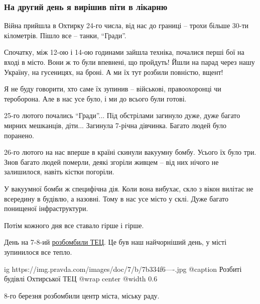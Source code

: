  
 
 
 
 

\subsubsection{На другий день я вирішив піти в лікарню}

Війна прийшла в Охтирку 24-го числа, від нас до границі – трохи більше 30-ти
кілометрів. Пішло все – танки, \enquote{Гради}.

Спочатку, між 12-ою і 14-ою годинами зайшла техніка, почалися перші бої на
вході в місто. Вони ж то були впевнені, що пройдуть! Йшли на парад через нашу
Україну, на гусеницях, на броні. А ми їх тут розбили повністю, вщент! 

Я не буду говорити, хто саме їх зупинив – військові, правоохоронці чи
тероборона. Але в нас усе було, і ми до всього були готові.

25-го лютого почались \enquote{Гради}... Під обстрілами загинуло дуже, дуже
багато мирних мешканців, діти... Загинула 7-річна дівчинка. Багато людей було
поранено.

26-го лютого на нас вперше в країні скинули вакуумну бомбу. Усього їх було три.
Знов багато людей померли, деякі згоріли живцем – від них нічого не залишилося,
навіть кістки погоріли. 


У вакуумної бомби ж специфічна дія. Коли вона вибухає, скло з вікон вилітає не
всередину в будівлю, а назовні. Тому в нас усе місто у склі. Дуже багато
понищеної інфраструктури. 

Потім кожного дня все ставало гірше і гірше.

День на 7-8-ий
\href{https://www.pravda.com.ua/news/2022/03/3/7327841/}{розбомбили ТЕЦ}. Це
був наш найчорніший день, у місті зупинилося все тепло.

\ifcmt
  ig https://img.pravda.com/images/doc/7/b/7b334f6----.jpg
	@caption Розбиті будівлі Охтирської ТЕЦ
  @wrap center
  @width 0.6
\fi

8-го березня розбомбили центр міста, міську раду.

